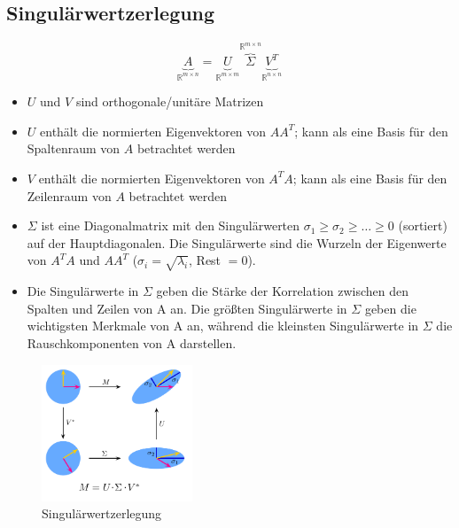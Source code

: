 \subsection{Singulärwertzerlegung}
\label{SVD}
\begin{equation*}
    \underbrace{A}_{\mathbb{R}^{m\times n}} = \underbrace{U}_{\mathbb{R}^{m\times m}} \overbrace{\Sigma}^{\mathbb{R}^{m\times n}} \underbrace{V^T}_{\mathbb{R}^{n\times n}}
\end{equation*}

\begin{itemize}
    \item \(U\) und \(V\) sind orthogonale/unitäre Matrizen
    \item \(U\) enthält die normierten Eigenvektoren von \(AA^T\); kann als eine Basis für den Spaltenraum von \(A\) betrachtet werden
    \item \(V\) enthält die normierten Eigenvektoren von \(A^TA\); kann als eine Basis für den Zeilenraum von \(A\) betrachtet werden
    \item \(\Sigma\) ist eine Diagonalmatrix mit den Singulärwerten \(\sigma_1 \geq \sigma_2 \geq \hdots \geq 0\) (sortiert) auf der Hauptdiagonalen. Die Singulärwerte sind die Wurzeln der Eigenwerte von \(A^TA\) und \(AA^T\) (\(\sigma_i = \sqrt{\lambda_i}\), Rest \(=0\)).    \item Die Singulärwerte in \(\Sigma\) geben die Stärke der Korrelation zwischen den Spalten und Zeilen von A an. Die größten Singulärwerte in \(\Sigma\) geben die wichtigsten Merkmale von A an, während die kleinsten Singulärwerte in \(\Sigma\) die Rauschkomponenten von A darstellen.
\end{itemize}


\begin{figure}[ht]
    \centering
    \includegraphics[width=0.4\textwidth]{lineareAlgebra/1920px-Singular-Value-Decomposition.svg.png}
    \caption*{Singulärwertzerlegung }
    \label{fig:svd}
\end{figure}

